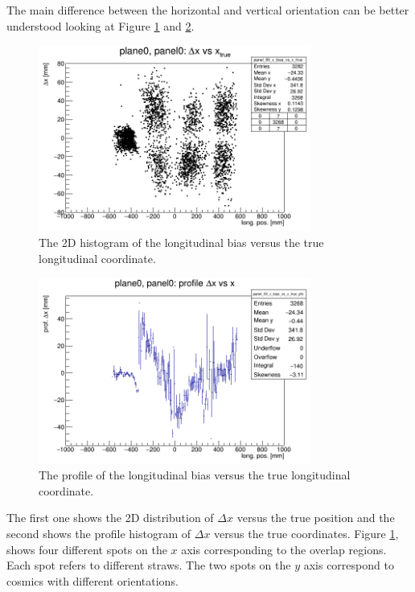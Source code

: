 The main difference between the horizontal and vertical orientation can be better 
understood looking at Figure \ref{fig:rec2D} and \ref{fig:profile}. 
\begin{figure}[!h]
    \centering
    \includegraphics[width=0.8\textwidth]{figures/png/panel_00_x_bias_vs_x.png}
    \caption[The 2D histogram of the longitudinal bias versus the true coordinate.]{The 2D histogram of 
    the longitudinal bias versus the true longitudinal coordinate.}
    \label{fig:rec2D}
\end{figure}
\begin{figure}[!h]
    \centering
    \includegraphics[width=0.8\textwidth]{figures/png/panel_00_x_bias_vs_x_prof.png}
    \caption[The profile of the longitudinal bias versus the true longitudinal coordinate.]{The profile of the longitudinal bias versus the true longitudinal coordinate.}
    \label{fig:profile}
\end{figure}
The first one shows the 2D distribution of $\Delta x$ 
versus the true position and the second shows the profile histogram of $\Delta x$ versus 
the true coordinates. 
Figure \ref{fig:rec2D}, shows four different 
spots on the $x$ axis corresponding to 
the overlap regions. Each spot refers to 
different straws. The two spots on the $y$ 
axis correspond to cosmics with different orientations. 

